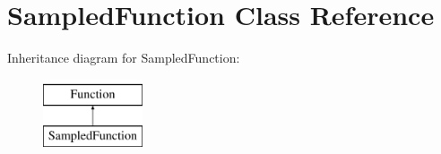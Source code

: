 \hypertarget{class_sampled_function}{}\section{Sampled\+Function Class Reference}
\label{class_sampled_function}
Inheritance diagram for Sampled\+Function\+:\begin{figure}[H]
\begin{center}
\leavevmode
\includegraphics[height=2.000000cm]{class_sampled_function}
\end{center}
\end{figure}
